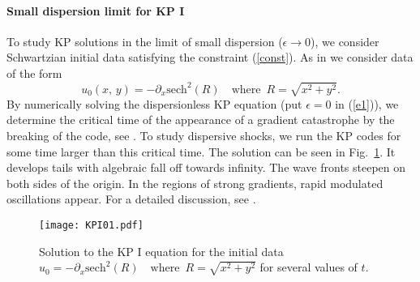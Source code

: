\documentclass[final]{siamltex}
\begin{document}
\paragraph{Small dispersion limit for KP I}
To study KP solutions in the limit of small dispersion 
($\epsilon\to0$), we consider Schwartzian initial data satisfying the constraint 
(\ref{const}).
As in \cite{KSM} we consider 
data of the form 
\begin{equation}\label{e12}
u_{0}(x,\, y)=-\partial_{x}\mbox{sech}^{2}(R)\,\,\,\,\,\,
\mbox{where}\,\,\, R=\sqrt{x^{2}+y^{2}}.
\end{equation}
By numerically solving the dispersionless KP equation (put 
$\epsilon=0$ in (\ref{e1})), we determine the critical time of the 
appearance of a gradient catastrophe by the breaking of the code, see 
\cite{KSM}. To study dispersive shocks, we run the KP codes for some 
time larger than this critical time. The solution can be seen 
in Fig.~\ref{figKPI}. It develops tails with algebraic fall 
off towards infinity. The wave fronts steepen on both sides of the 
origin. In the regions of strong gradients, rapid modulated 
oscillations appear. For a detailed discussion, see \cite{KSM}.
\begin{figure}[htb!]
 \centering
 \texttt{[image: KPI01.pdf]}
 \caption{Solution to the KP I equation for the initial data $u_{0}=-\partial_{x}\mbox{sech}^{2}(R)\,\,\,\,\,\,
\mbox{where}\,\,\, R=\sqrt{x^{2}+y^{2}}$ for several values of $t$.}
 \label{figKPI}
\end{figure}
\end{document}
